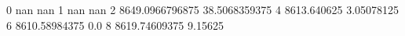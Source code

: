 0 nan nan
1 nan nan
2 8649.0966796875 38.5068359375
4 8613.640625 3.05078125
6 8610.58984375 0.0
8 8619.74609375 9.15625
